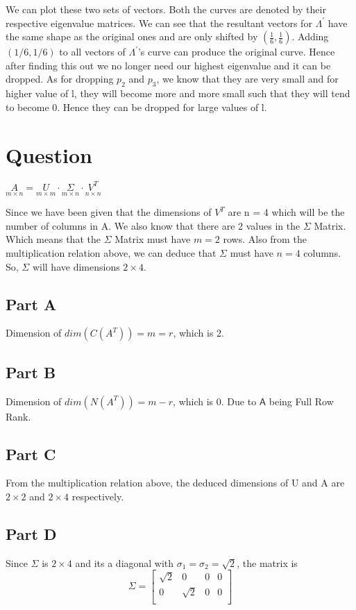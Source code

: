 \documentclass[12pt,a4paper]{article}
\newcommand{\mat}[1]{\boldsymbol { \mathsf{#1}} }
\begin{document}
We can plot these two sets of vectors. Both the curves are denoted by their respective eigenvalue matrices. We can see that the resultant vectors for $\Lambda^{'}$ have the same shape as the original ones and are only shifted by $(\frac{1}{6},\frac{1}{6})$. Adding $(1/6,1/6)$ to all vectors of $\Lambda^{'}$'s curve can produce the original curve. Hence after finding this out we no longer need our highest eigenvalue and it can be dropped. As for dropping $p_2$ and $p_3$, we know that they are very small and for higher value of l, they will become more and more small such that they will tend to become 0. Hence they can be dropped for large values of l.


    

\section{Question}

{\centering
$\underset{m \times n}{A} = \underset{m \times m}{U}\cdot \underset{m \times n}{\Sigma}\cdot \underset{n \times n}{V^T}$

}

Since we have been given that the dimensions of $V^T$ are n = 4 which will be the number of columns in A. We also know that there are 2 values in the $\Sigma$ Matrix. Which means that the $\Sigma$ Matrix must have $m=2$ rows. Also from the multiplication relation above, we can deduce that $\Sigma$ must have $n = 4$ columns. So, $\Sigma$ will have dimensions $2 \times 4$.
\subsection{Part A}
Dimension of $dim(C(A^T)) = m = r$, which is 2.
\subsection{Part B}
Dimension of $dim(N(A^T)) = m - r$, which is 0. Due to $\mat{A}$ being Full Row Rank.
\subsection{Part C}
From the multiplication relation above, the deduced dimensions of U and A are $2\times2$ and $2\times 4$ respectively.
\subsection{Part D}
Since $\Sigma$ is $2\times4$ and its a diagonal with $\sigma_1 = \sigma_2 = \sqrt{2}$, the matrix is 
$$
\Sigma =
\begin{bmatrix}
\sqrt{2} & 0 & 0 & 0 \\
 0 &\sqrt{2} & 0 & 0 \\
\end{bmatrix}
$$
\end{document}
